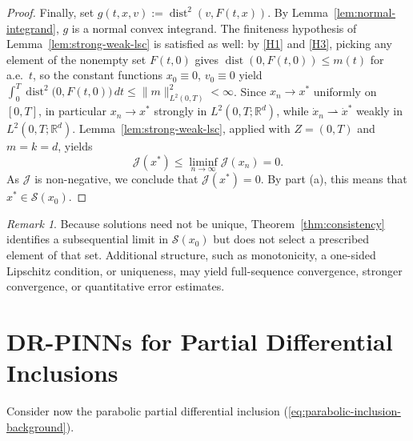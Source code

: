 \documentclass[11pt]{elsarticle}
\theoremstyle{definition}
\theoremstyle{remark}
\newtheorem{remark}[theorem]{Remark}
\numberwithin{equation}{section}
\def\dist{\operatorname{dist}}
\begin{document}
\begin{proof}
		Finally, set $g(t, x, v) := \operatorname{dist}^2(v, F(t,x))$. 
		By Lemma~\ref{lem:normal-integrand}, $g$ is a normal convex
		integrand. The finiteness hypothesis of
		Lemma~\ref{lem:strong-weak-lsc} is satisfied as well: by
		\ref{H1} and \ref{H3}, picking any element of the nonempty set
		$F(t,0)$ gives $\dist(0,F(t,0))\le m(t)$ for a.e.\ $t$, so the
		constant functions $x_0\equiv0$, $v_0\equiv0$ yield
		$\int_0^T\dist^2\bigl(0,F(t,0)\bigr)\,dt
		\le\|m\|_{L^2(0,T)}^2<\infty$. Since $x_n\to x^*$ uniformly on $[0,T]$, in particular
		$x_n\to x^*$ strongly in $L^2(0,T;\mathbb{R}^d)$, while
		$\dot{x}_n\rightharpoonup\dot{x}^*$ weakly in
		$L^2(0,T;\mathbb{R}^d)$. Lemma~\ref{lem:strong-weak-lsc}, applied
		with $Z=(0,T)$ and $m=k=d$, yields
		\[
		\mathcal{J}(x^*) \le \liminf_{n \to \infty} \mathcal{J}(x_n) = 0.
		\]
		As $\mathcal{J}$ is non-negative, we conclude that $\mathcal{J}(x^*) = 0$. By part (a), this means that $x^* \in \mathcal{S}(x_0)$.
	\end{proof}
	
	\begin{remark}
		Because solutions need not be unique, Theorem~\ref{thm:consistency}
		identifies a subsequential limit in $\mathcal{S}(x_0)$ but does not
		select a prescribed element of that set. Additional structure, such as
		monotonicity, a one-sided Lipschitz condition, or uniqueness, may yield
		full-sequence convergence, stronger convergence, or quantitative error
		estimates.
	\end{remark}
	
	
	\section{DR-PINNs for Partial Differential Inclusions}
	\label{sec:pde}
	
	Consider now the parabolic partial differential
	inclusion (\ref{eq:parabolic-inclusion-background}).
	
\end{document}
